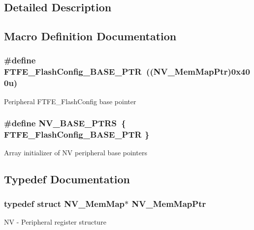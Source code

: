 \subsection{Detailed Description}


\subsection{Macro Definition Documentation}
\hypertarget{group___n_v___peripheral_ga824c84d1d5dcc180128d85f4f676b4c5}{}
\subsubsection[{F\+T\+F\+E\+\_\+\+Flash\+Config\+\_\+\+B\+A\+S\+E\+\_\+\+P\+T\+R}]{\setlength{\rightskip}{0pt plus 5cm}\#define F\+T\+F\+E\+\_\+\+Flash\+Config\+\_\+\+B\+A\+S\+E\+\_\+\+P\+T\+R~(({\bf N\+V\+\_\+\+Mem\+Map\+Ptr})0x400u)}\label{group___n_v___peripheral_ga824c84d1d5dcc180128d85f4f676b4c5}
Peripheral F\+T\+F\+E\+\_\+\+Flash\+Config base pointer \hypertarget{group___n_v___peripheral_ga1e44e66a8945b675dcebb6fbd6bdc85b}{}
\subsubsection[{N\+V\+\_\+\+B\+A\+S\+E\+\_\+\+P\+T\+R\+S}]{\setlength{\rightskip}{0pt plus 5cm}\#define N\+V\+\_\+\+B\+A\+S\+E\+\_\+\+P\+T\+R\+S~\{ {\bf F\+T\+F\+E\+\_\+\+Flash\+Config\+\_\+\+B\+A\+S\+E\+\_\+\+P\+T\+R} \}}\label{group___n_v___peripheral_ga1e44e66a8945b675dcebb6fbd6bdc85b}
Array initializer of N\+V peripheral base pointers 

\subsection{Typedef Documentation}
\hypertarget{group___n_v___peripheral_ga9aac431b01e6b976f2f4e32409ab725f}{}
\subsubsection[{N\+V\+\_\+\+Mem\+Map\+Ptr}]{\setlength{\rightskip}{0pt plus 5cm}typedef struct {\bf N\+V\+\_\+\+Mem\+Map}$\ast$ {\bf N\+V\+\_\+\+Mem\+Map\+Ptr}}\label{group___n_v___peripheral_ga9aac431b01e6b976f2f4e32409ab725f}
N\+V -\/ Peripheral register structure 